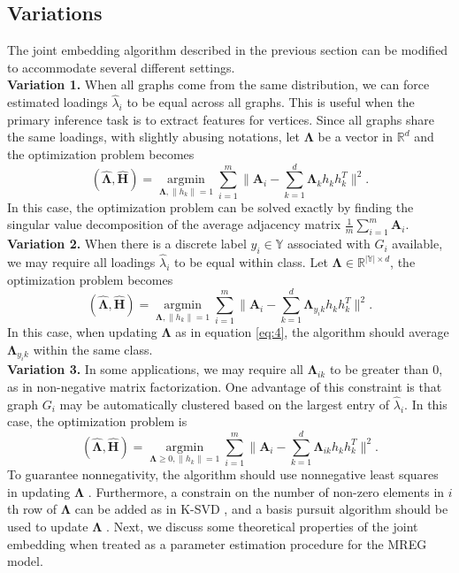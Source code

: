 \documentclass[10pt,journal,compsoc]{IEEEtran}
\newcommand{\bA}{\mathbf{A}}
\newcommand{\bH}{\mathbf{H}}
\newcommand{\bLambda}{\mathbf{\Lambda}}
\begin{document}
\subsection{Variations}
The joint embedding algorithm described in the previous section can be modified to accommodate several different settings. \\
\textbf{Variation 1.} When all graphs come from the same distribution, we can force estimated loadings $\hat{\lambda}_i$ to be equal across all graphs. This is useful when the primary inference task is to extract features for vertices. Since all graphs share the same loadings, with slightly abusing notations, let $\bLambda$ be a vector in $\mathbb{R}^d$ and the optimization problem becomes
\[ (\hat{\bLambda},\hat{\bH}) = \underset{\bLambda,\|h_k\|=1}{\operatorname{argmin}} \sum\limits_{i=1}^{m} \| \bA_i- \sum\limits_{k=1}^{d} \bLambda_{k} h_k h_k^T \|  ^2.  \] 
In this case, the optimization problem can be solved exactly by finding the singular value decomposition of the average adjacency matrix $\frac{1}{m}\sum\limits_{i=1}^{m}\bA_i$. \\
\textbf{Variation 2.} When there is a discrete label $y_i \in \mathbb{Y}$ associated with $G_i$ available, we may require all loadings $\hat{\lambda}_i$ to be equal within class. Let $\bLambda \in \mathbb{R}^{|\mathbb{Y}| \times d}$, the optimization problem becomes
\[ (\hat{\bLambda},\hat{\bH}) = \underset{\bLambda,\|h_k\|=1}{\operatorname{argmin}} \sum\limits_{i=1}^{m} \| \bA_i- \sum\limits_{k=1}^{d} \bLambda_{y_i k} h_k h_k ^T \|  ^2.  \] 
In this case, when updating $\bLambda$ as in equation \eqref{eq:4}, the algorithm should average $\bLambda_{y_i k}$ within the same class. \\
\textbf{Variation 3.} In some applications, we may require all $\bLambda_{ik}$ to be greater than $0$, as in non-negative matrix factorization. One advantage of this constraint is that graph $G_i$ may be automatically clustered  based on the largest entry of $\hat{\lambda}_{i}$. In this case, the optimization problem is
\[ (\hat{\bLambda},\hat{\bH}) = \underset{\bLambda \geq 0,\|h_k\|=1}{\operatorname{argmin}} \sum\limits_{i=1}^{m} \| \bA_i- \sum\limits_{k=1}^{d} \bLambda_{ik} h_k h_k ^T \|  ^2.  \] 
To guarantee nonnegativity, the algorithm should use nonnegative least squares in updating $\bLambda$ \cite{kim2008nonnegative}. Furthermore, a constrain on the number of non-zero elements in $i$th row of $\bLambda$ can be added as in K-SVD \cite{aharon2006rm}, and a basis pursuit algorithm should be used to update $\bLambda$ \cite{chen2001atomic, tropp2007signal}. Next, we discuss some theoretical properties of the joint embedding when treated as a parameter estimation procedure for the MREG model.
\end{document}
